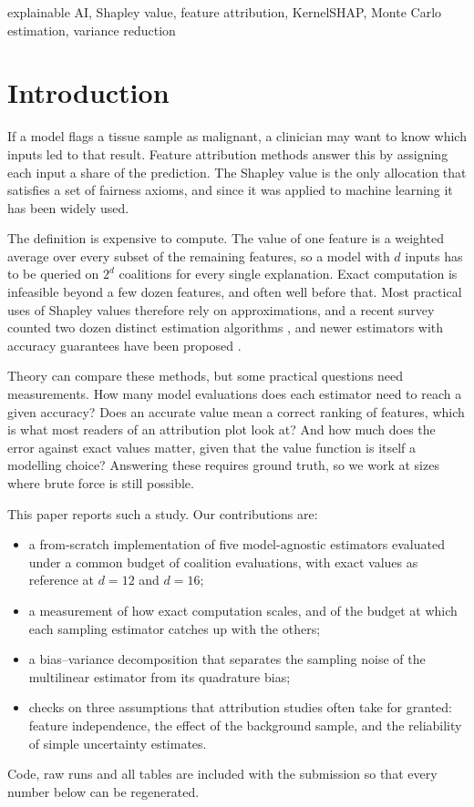 \documentclass[conference]{IEEEtran}
\begin{document}
\begin{IEEEkeywords}
explainable AI, Shapley value, feature attribution, KernelSHAP, Monte Carlo estimation, variance reduction
\end{IEEEkeywords}

\section{Introduction}
If a model flags a tissue sample as malignant, a clinician may want to know which inputs led to that result. Feature attribution methods answer this by assigning each input a share of the prediction. The Shapley value \cite{shapley1953} is the only allocation that satisfies a set of fairness axioms, and since it was applied to machine learning \cite{strumbelj2014,lundberg2017} it has been widely used.

The definition is expensive to compute. The value of one feature is a weighted average over every subset of the remaining features, so a model with $d$ inputs has to be queried on $2^d$ coalitions for every single explanation. Exact computation is infeasible beyond a few dozen features, and often well before that. Most practical uses of Shapley values therefore rely on approximations, and a recent survey counted two dozen distinct estimation algorithms \cite{chen2023algorithms}, and newer estimators with accuracy guarantees have been proposed \cite{musco2025,witter2025}.

Theory can compare these methods, but some practical questions need measurements. How many model evaluations does each estimator need to reach a given accuracy? Does an accurate value mean a correct ranking of features, which is what most readers of an attribution plot look at? And how much does the error against exact values matter, given that the value function is itself a modelling choice? Answering these requires ground truth, so we work at sizes where brute force is still possible.

This paper reports such a study. Our contributions are:
\begin{itemize}
\item a from-scratch implementation of five model-agnostic estimators evaluated under a common budget of coalition evaluations, with exact values as reference at $d=12$ and $d=16$;
\item a measurement of how exact computation scales, and of the budget at which each sampling estimator catches up with the others;
\item a bias--variance decomposition that separates the sampling noise of the multilinear estimator from its quadrature bias;
\item checks on three assumptions that attribution studies often take for granted: feature independence, the effect of the background sample, and the reliability of simple uncertainty estimates.
\end{itemize}
Code, raw runs and all tables are included with the submission so that every number below can be regenerated.
\end{document}

